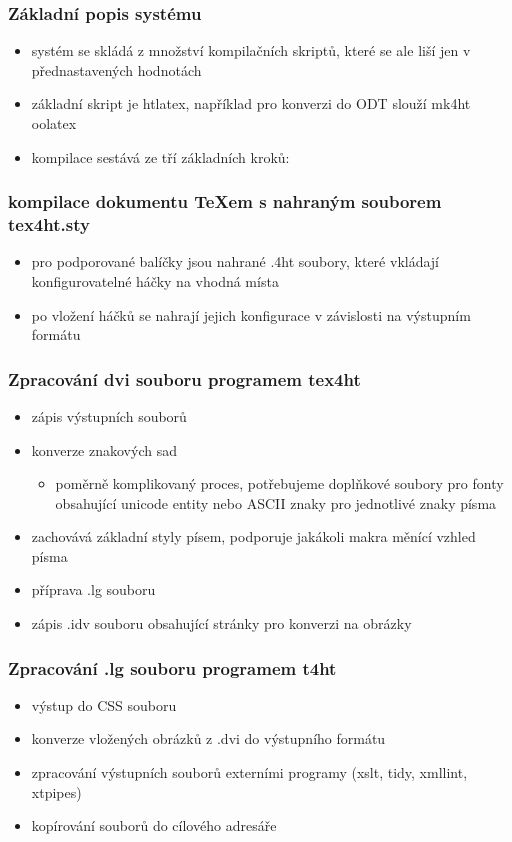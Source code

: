 \documentclass[czech]{beamer}
\begin{document}
\begin{frame}

  \frametitle{Základní popis systému}
  \begin{itemize}
    \item systém se skládá z množství kompilačních skriptů, které se ale liší
      jen v přednastavených hodnotách
  \item základní skript je htlatex, například pro konverzi do ODT slouží mk4ht oolatex
  \item kompilace sestává ze tří základních kroků:
\end{itemize}
\end{frame}
\begin{frame}
  \frametitle{kompilace dokumentu TeXem s nahraným souborem tex4ht.sty}
  \begin{itemize}
    \item pro podporované balíčky jsou nahrané .4ht soubory, které vkládají
        konfigurovatelné háčky na vhodná místa
    \item po vložení háčků se nahrají jejich konfigurace v závislosti na
        výstupním formátu
  \end{itemize}
\end{frame}
\begin{frame}
  \frametitle{Zpracování dvi souboru programem tex4ht}
  \begin{itemize}
    \item   zápis výstupních souborů
    \item   konverze znakových sad
      \begin{itemize} 
        \item  poměrně komplikovaný proces, potřebujeme
          doplňkové soubory pro fonty obsahující unicode entity nebo ASCII
          znaky pro jednotlivé znaky písma
  \end{itemize}
    \item   zachovává základní styly písem, podporuje jakákoli makra měnící vzhled písma
    \item   příprava .lg souboru
    \item   zápis .idv souboru obsahující stránky pro konverzi na obrázky
  \end{itemize}
\end{frame}
\begin{frame}
  \frametitle{Zpracování .lg souboru programem t4ht}
  \begin{itemize}
    \item   výstup do CSS souboru
    \item   konverze vložených obrázků z .dvi do výstupního formátu
    \item   zpracování výstupních souborů externími programy 
    (xslt, tidy, xmllint, xtpipes)
    \item   kopírování souborů do cílového adresáře
  \end{itemize}
\end{frame}
\end{document}
